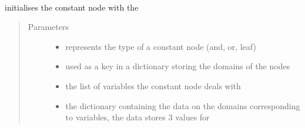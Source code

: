\documentclass[letterpaper,10pt,english,openany,oneside]{sphinxmanual}
\begin{document}
\begin{fulllineitems}
\begin{fulllineitems}
\begin{quote}
\begin{description}
\end{description}\end{quote}

\end{fulllineitems}


\end{fulllineitems}


\begin{fulllineitems}
\label{\detokenize{index:circuit.ConstNode}}~

\begin{fulllineitems}
\label{\detokenize{index:circuit.ConstNode.__init__}}
initialises the constant node with the
\begin{quote}\begin{description}
\item[{Parameters}] \leavevmode\begin{itemize}
\item {} 
 \textendash{} represents the type of a constant node (and, or, leaf)

\item {} 
 \textendash{} used as a key in a dictionary storing the domains of the nodes

\item {} 
 \textendash{} the list of variables the constant node deals with

\item {} 
 \textendash{} the dictionary containing the data on the domains corresponding to variables, the data stores 3 values for


\end{itemize}
\end{description}
\end{quote}
\end{fulllineitems}
\end{fulllineitems}
\end{document}
